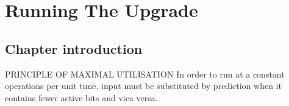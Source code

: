 \chapter{Running The Upgrade}
\section{Chapter introduction}
PRINCIPLE OF MAXIMAL UTILISATION
In order to run at a constant operations per unit time, input must be substituted by prediction when it contains fewer active bits and vica versa.
